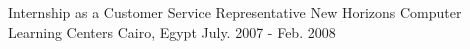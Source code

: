 

\begin{cventries}

  \cventry
    {Internship as a Customer Service Representative} %
    {New Horizons Computer Learning Centers} %
    {Cairo, Egypt} %
    {July. 2007 - Feb. 2008} %
    {}
    
\end{cventries}
